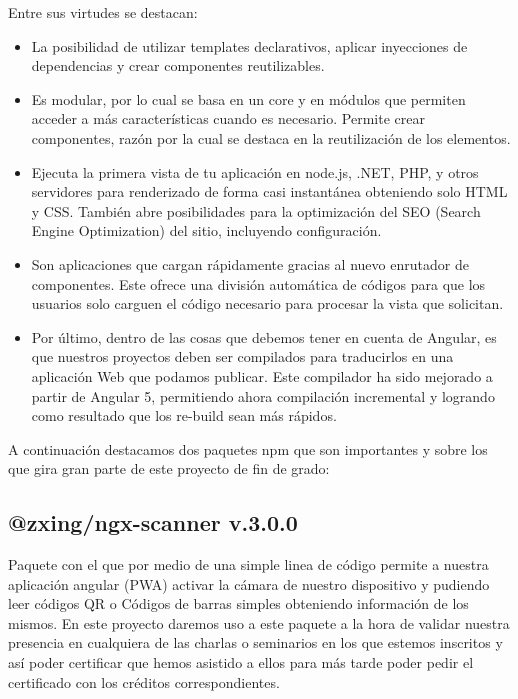 \documentclass[a4paper, 12pt]{book}
\begin{document}
Entre sus virtudes se destacan:
\begin{itemize}
\item La posibilidad de utilizar templates declarativos, aplicar inyecciones de dependencias y crear componentes reutilizables.

\item Es modular, por lo cual se basa en un core y en módulos que permiten acceder a más características cuando es necesario. Permite crear componentes, razón por la cual se destaca en la reutilización de los elementos.


\item Ejecuta la primera vista de tu aplicación en node.js, .NET, PHP, y otros servidores para renderizado de forma casi instantánea obteniendo solo HTML y CSS. También abre posibilidades para la optimización del SEO (Search Engine Optimization) del sitio, incluyendo configuración.

\item Son aplicaciones que cargan rápidamente gracias al nuevo enrutador de componentes. Este ofrece una división automática de códigos para que los usuarios solo carguen el código necesario para procesar la vista que solicitan.

\item Por último, dentro de las cosas que debemos tener en cuenta de Angular, es que nuestros proyectos deben ser compilados para traducirlos en una aplicación Web que podamos publicar. Este compilador ha sido mejorado a partir de Angular 5, permitiendo ahora compilación incremental y logrando como resultado que los re-build sean más rápidos.
\end{itemize}

A continuación destacamos dos paquetes npm que son importantes y sobre los que gira gran parte de este proyecto de fin de grado:

\subsection{@zxing/ngx-scanner v.3.0.0}
\label{subsec:@zxing/ngx-scanner}
Paquete con el que por medio de una simple linea de código permite a nuestra aplicación angular (PWA) activar la cámara de nuestro dispositivo y pudiendo leer códigos QR o Códigos de barras simples obteniendo información de los mismos. 
	En este proyecto daremos uso a este paquete a la hora de validar nuestra presencia en cualquiera de las charlas o seminarios en los que estemos inscritos y así poder certificar que hemos asistido a ellos para más tarde poder pedir el certificado con los créditos correspondientes.
\end{document}
